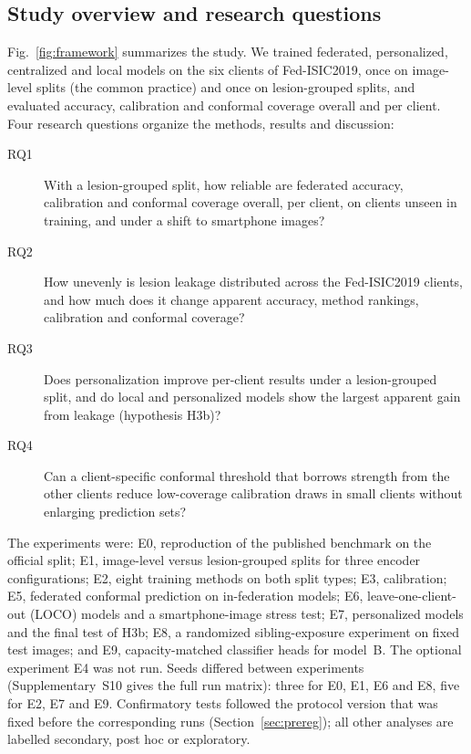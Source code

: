\documentclass[VANCOUVER,Times1COL]{WileyNJDv5}
\begin{document}
\subsection{Study overview and research questions}
\label{sec:overview}

Fig.~\ref{fig:framework} summarizes the study. We trained federated, personalized, centralized and
local models on the six clients of Fed-ISIC2019, once on image-level splits (the common practice) and
once on lesion-grouped splits, and evaluated accuracy, calibration and conformal coverage overall and per
client. Four research questions organize the methods, results and discussion:

\begin{description}
\item[RQ1] With a lesion-grouped split, how reliable are federated accuracy, calibration and conformal
  coverage overall, per client, on clients unseen in training, and under a shift to smartphone images?
\item[RQ2] How unevenly is lesion leakage distributed across the Fed-ISIC2019 clients, and how much does
  it change apparent accuracy, method rankings, calibration and conformal coverage?
\item[RQ3] Does personalization improve per-client results under a lesion-grouped split, and do local
  and personalized models show the largest apparent gain from leakage (hypothesis H3b)?
\item[RQ4] Can a client-specific conformal threshold that borrows strength from the other clients
  reduce low-coverage calibration draws in small clients without enlarging prediction sets?
\end{description}

The experiments were: E0, reproduction of the published benchmark on the official split; E1,
image-level versus lesion-grouped splits for three encoder configurations; E2, eight training methods on
both split types; E3, calibration; E5, federated conformal prediction on in-federation models; E6,
leave-one-client-out (LOCO) models and a smartphone-image stress test; E7, personalized models and the
final test of H3b; E8, a randomized sibling-exposure experiment on fixed test images; and E9,
capacity-matched classifier heads for model~B. The optional experiment E4 was not run. Seeds differed
between experiments (Supplementary~S10 gives the full run matrix): three for E0, E1, E6 and E8, five for E2, E7
and E9. Confirmatory tests followed the protocol version that was fixed before the corresponding runs
(Section~\ref{sec:prereg}); all other analyses are labelled secondary, post hoc or exploratory.
\end{document}
